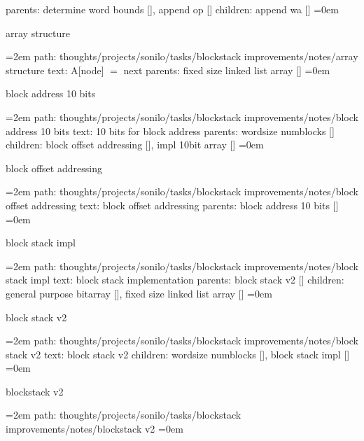 \smallskip
parents:  determine word bounds [], append op []
\smallskip
children: append wa []
\smallskip
\leftskip=0em
\par\endgroup
\bigskip
{}
array structure
\smallskip
\par\begingroup
\leftskip=2em
path: thoughts/projects/sonilo/tasks/blockstack improvements/notes/array structure
\smallskip
text:  A[node] $=$ next
\smallskip
parents:  fixed size linked list array []
\smallskip
\leftskip=0em
\par\endgroup
\bigskip
{}
block address 10 bits
\smallskip
\par\begingroup
\leftskip=2em
path: thoughts/projects/sonilo/tasks/blockstack improvements/notes/block address 10 bits
\smallskip
text:  10 bits for block address
\smallskip
parents:  wordsize numblocks []
\smallskip
children: block offset addressing [], impl 10bit array []
\smallskip
\leftskip=0em
\par\endgroup
\bigskip
{}
block offset addressing
\smallskip
\par\begingroup
\leftskip=2em
path: thoughts/projects/sonilo/tasks/blockstack improvements/notes/block offset addressing
\smallskip
text:  block offset addressing
\smallskip
parents:  block address 10 bits []
\smallskip
\leftskip=0em
\par\endgroup
\bigskip
{}
block stack impl
\smallskip
\par\begingroup
\leftskip=2em
path: thoughts/projects/sonilo/tasks/blockstack improvements/notes/block stack impl
\smallskip
text:  block stack implementation
\smallskip
parents:  block stack v2 []
\smallskip
children: general purpose bitarray [], fixed size linked list array []
\smallskip
\leftskip=0em
\par\endgroup
\bigskip
{}
block stack v2
\smallskip
\par\begingroup
\leftskip=2em
path: thoughts/projects/sonilo/tasks/blockstack improvements/notes/block stack v2
\smallskip
text:  block stack v2
\smallskip
children: wordsize numblocks [], block stack impl []
\smallskip
\leftskip=0em
\par\endgroup
\bigskip
{}
blockstack v2
\smallskip
\par\begingroup
\leftskip=2em
path: thoughts/projects/sonilo/tasks/blockstack improvements/notes/blockstack v2
\smallskip
\leftskip=0em
\par\endgroup
